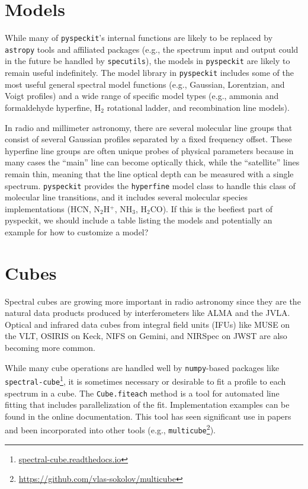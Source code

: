 \documentclass[twocolumn]{aastex62}
\newcommand{\pyspeckit}{\texttt{pyspeckit}\xspace}
\newcommand{\astropy}{\texttt{astropy}\xspace}
\newcommand{\hh}{\ensuremath{\mathrm{H}_2}\xspace}
\begin{document}
\section{Models}
\label{sec:models}
While many of \pyspeckit's internal functions are likely to be replaced by
\astropy tools and affiliated packages (e.g., the spectrum input and output
could in the future be handled by \texttt{specutils}), the models in \pyspeckit
are likely to remain useful indefinitely.  The model library in \pyspeckit
includes some of the most useful general spectral model functions (e.g.,
Gaussian, Lorentzian, and Voigt profiles) and a wide range of specific model
types (e.g., ammonia and formaldehyde hyperfine, \hh rotational ladder, and
recombination line models).

In radio and millimeter astronomy, there are several molecular line groups that
consist of several Gaussian profiles separated by a fixed frequency offset.
These hyperfine line groups are often unique probes of physical parameters
because in many cases the ``main'' line can become optically thick, while the
``satellite'' lines remain thin, meaning that the line optical depth can be
measured with a single spectrum.  \pyspeckit provides the \texttt{hyperfine}
model class to handle this class of molecular line transitions, and it includes
several molecular species implementations (HCN, N$_2$H$^+$, NH$_3$,
H$_2$CO). {\color{red}If this is the beefiest part of pyspeckit, we should include a table
listing the models and potentially an example for how to customize a model?}

\section{Cubes}
\label{sec:cubes}
Spectral cubes are growing more important in radio astronomy since they are the
natural data products produced by interferometers like ALMA and the JVLA.
Optical and infrared data cubes from integral field units (IFUs) like MUSE on
the VLT, OSIRIS on Keck,  NIFS on Gemini, and NIRSpec on JWST are also becoming
more common.

While many cube operations are handled well by \texttt{numpy}-based packages
like \texttt{spectral-cube}\footnote{\url{spectral-cube.readthedocs.io}},
it is sometimes necessary or desirable to fit a profile to each spectrum
in a cube.  The \texttt{Cube.fiteach} method is a tool for automated line
fitting that includes parallelization of the fit. Implementation examples can be
found in the online documentation. This tool  has  seen significant use in
papers and been incorporated into other tools (e.g.,
\texttt{multicube}\footnote{\url{https://github.com/vlas-sokolov/multicube}}).
\end{document}
